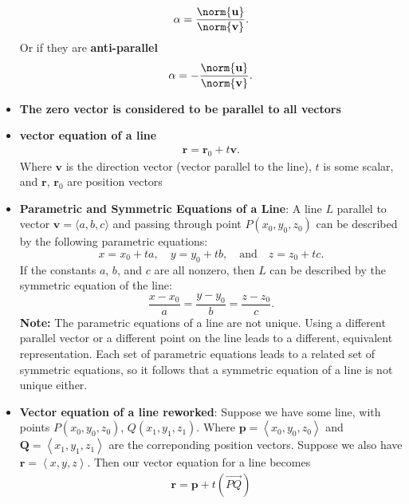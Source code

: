 \documentclass{report}
\begin{document}
\begin{itemize}
            \begin{align*}
                \alpha = \frac{\norm{\mathbf{u}}}{\norm{\mathbf{v}}}
            .\end{align*}
            Or if they are \textbf{anti-parallel}
            \begin{align*}
                \alpha = -\frac{\norm{\mathbf{u}}}{\norm{\mathbf{v}}}
            .\end{align*}
        \item \textbf{The zero vector is considered to be parallel to all vectors}
        \item \textbf{vector equation of a line}
            \begin{align*}
                \mathbf{r} = \mathbf{r}_{0} + t\mathbf{v} 
            .\end{align*}
            Where $\mathbf{v}$ is the direction vector (vector parallel to the line), $t$ is some scalar, and $\mathbf{r}$, $\mathbf{r}_{0}$ are position vectors
        \item \textbf{Parametric and Symmetric Equations of a Line}:
            A line $L$ parallel to vector $\mathbf{v}=\langle a,b,c \rangle$ and passing through point $P(x_0,y_0,z_0)$ can be described by the following parametric equations:
            \[
                x=x_0+ta, \quad y=y_0+tb, \quad \text{and} \quad z=z_0+tc.
            \]
            If the constants $a$, $b$, and $c$ are all nonzero, then $L$ can be described by the symmetric equation of the line:
            \[
                \frac{x-x_0}{a} = \frac{y-y_0}{b} = \frac{z-z_0}{c}.
            \]
            \bigbreak \noindent 
            \textbf{Note:} The parametric equations of a line are not unique. Using a different parallel vector or a different point on the line leads to a different, equivalent representation. Each set of parametric equations leads to a related set of symmetric equations, so it follows that a symmetric equation of a line is not unique either.
        \item \textbf{Vector equation of a line reworked}: Suppose we have some line, with points $P(x_{0}, y_{0}, z_{0})$, $Q(x_{1}, y_{1}, z_{1})$. Where $\mathbf{p} = \left\langle x_{0}, y_{0}, z_{0}\right\rangle $ and $\mathbf{Q} = \left\langle x_{1}, y_{1}, z_{1}\right\rangle $ are the correponding position vectors. Suppose we also have $\mathbf{r} = \left\langle x,y,z \right\rangle $. Then our vector equation for a line becomes 
            \begin{align*}
                \mathbf{r} = \mathbf{p} + t\left(\vec{PQ}\right)

\end{align*}
\end{itemize}
\end{document}

